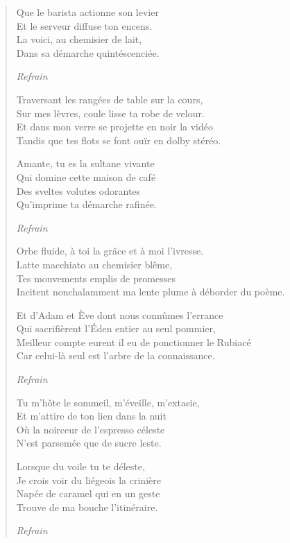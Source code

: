 \begin{verse}
Que le barista actionne son levier\\
Et le serveur diffuse ton encens.\\
La voici, au chemisier de lait,\\
Dans sa démarche quintéscenciée.

\emph{Refrain}

Traversant les rangées de table sur la cours,\\
Sur mes lèvres, coule lisse ta robe de velour.\\
Et dans mon verre se projette en noir la vidéo\\
Tandis que tes flots se font ouïr en dolby stéréo.

Amante, tu es la sultane vivante\\
Qui domine cette maison de café\\
Des sveltes volutes odorantes\\
Qu’imprime ta démarche rafinée.

\emph{Refrain}

Orbe fluide, à toi la grâce et à moi l’ivresse.\\
Latte macchiato au chemisier blême,\\
Tes mouvements emplis de promesses\\
Incitent nonchalamment ma lente plume à déborder du poème.

Et d’Adam et Ève dont nous connûmes l’errance\\
Qui sacrifièrent l’Éden entier au seul pommier,\\
Meilleur compte eurent il eu de ponctionner le Rubiacé\\
Car celui-là seul est l’arbre de la connaissance.

\emph{Refrain}

Tu m’hôte le sommeil, m’éveille, m’extasie,\\
Et m’attire de ton lien dans la nuit\\
Où la noirceur de l’espresso céleste\\
N’est parsemée que de sucre leste.

Lorsque du voile tu te déleste,\\
Je crois voir du liégeois la crinière\\
Napée de caramel qui en un geste\\
Trouve de ma bouche l’itinéraire.

\emph{Refrain}
\end{verse}

